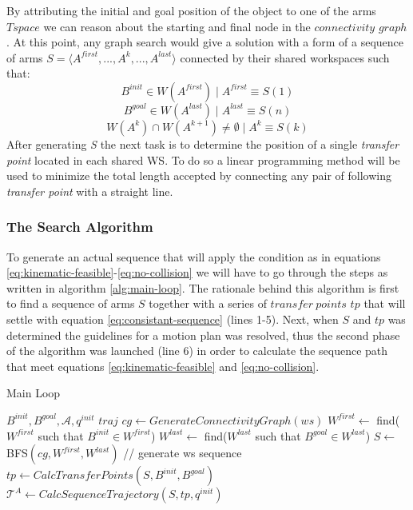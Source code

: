 By attributing the initial and goal position of the object to one of the arms $Tspace$ we can reason about the starting and final node in the $connectivity$ $graph$. 
At this point, any graph search would give a solution with a form of a sequence of arms $S = \langle A^{first},...,A^k,...,A^{last} \rangle$ connected by their shared workspaces such that:
\begin{equation}
B^{init} \in W(A^{first})\mid A^{first}\equiv S(1)
\end{equation}
\begin{equation}
B^{goal} \in W(A^{last})\mid A^{last}\equiv S(n)
\end{equation}
\begin{equation}
W(A^{k})\cap W(A^{k+1})\neq \emptyset \mid A^{k}\equiv S(k)
\end{equation}
After generating \textit{S} the next task is to determine the position of a single \textit{transfer point} located in each shared WS. To do so a linear programming method will be used to minimize the total length accepted by connecting any pair of following \textit{transfer point} with a straight line.


\subsubsection*{The Search Algorithm}
To generate an actual sequence that will apply the condition as in equations \eqref{eq:kinematic-feasible}-\eqref{eq:no-collision} we will have to go through the steps as written in algorithm \ref{alg:main-loop}. The rationale behind this algorithm is first to find a sequence of arms $S$ together with a series of $transfer~points$ $tp$ that will settle with equation \eqref{eq:consistant-sequence} (lines 1-5). Next, when $S$ and $tp$ was determined the guidelines for a motion plan was resolved, thus the second phase of the algorithm was launched (line 6) in order to calculate the sequence path that meet equations \eqref{eq:kinematic-feasible} and \eqref{eq:no-collision}. 

\begin{algorithm}
\caption{Main Loop} \label{alg:main-loop}
\begin{algorithmic}  [1] %
\REQUIRE $B^{init},B^{goal},\mathcal{A},q^{init}$
\ENSURE $traj$
	\STATE $cg\leftarrow GenerateConnectivityGraph(ws)$
	\STATE $W^{first}\leftarrow $ find($W^{first}$ such that $B^{init}\in W^{first}$)
	\STATE $W^{last}\leftarrow $ find($W^{last}$ such that $B^{goal}\in W^{last}$)
	\STATE $S\leftarrow$ BFS$( cg,W^{first},W^{last})$ // generate ws sequence
	\STATE $tp\leftarrow CalcTransferPoints( S,B^{init},B^{goal} )$
\STATE $\mathcal{T}^A \leftarrow CalcSequenceTrajectory( S,tp,q^{init})$
\end{algorithmic}
\end{algorithm}








